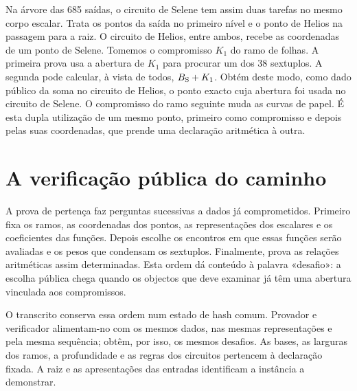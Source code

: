 Na árvore das 685 saídas, o circuito de Selene tem assim duas
tarefas no mesmo corpo escalar. Trata os pontos da saída no
primeiro nível e o ponto de Helios na passagem para a raiz.
O circuito de Helios, entre ambos, recebe as coordenadas de um
ponto de Selene. Tomemos o compromisso \(K_1\) do ramo de
folhas. A primeira prova usa a abertura de \(K_1\) para procurar
um dos 38 sextuplos. A segunda pode calcular, à vista de todos,
\(B_{\rm S}+K_1\). Obtém deste modo, como dado público da soma
no circuito de Helios, o ponto exacto cuja abertura foi usada
no circuito de Selene. O compromisso do ramo seguinte muda as
curvas de papel. É esta dupla utilização de um mesmo ponto,
primeiro como compromisso e depois pelas suas coordenadas, que
prende uma declaração aritmética à outra.

\section{A verificação pública do caminho}
\label{sec:fcmp-membership-transcript}
\label{sec:fcmp-challenge-domain}
\label{sec:fcmp-sampling-security}

A prova de pertença faz perguntas sucessivas a dados já
comprometidos. Primeiro fixa os ramos, as coordenadas dos
pontos, as representações dos escalares e os coeficientes
das funções. Depois escolhe os encontros em que essas funções
serão avaliadas e os pesos que condensam os sextuplos.
Finalmente, prova as relações aritméticas assim determinadas.
Esta ordem dá conteúdo à palavra «desafio»: a escolha pública
chega quando os objectos que deve examinar já têm uma abertura
vinculada aos compromissos.

O transcrito conserva essa ordem num estado de hash comum.
Provador e verificador alimentam-no com os mesmos dados,
nas mesmas representações e pela mesma sequência; obtêm,
por isso, os mesmos desafios. As bases, as larguras dos ramos,
a profundidade e as regras dos circuitos pertencem à declaração
fixada. A raiz e as apresentações das entradas identificam
a instância a demonstrar.

